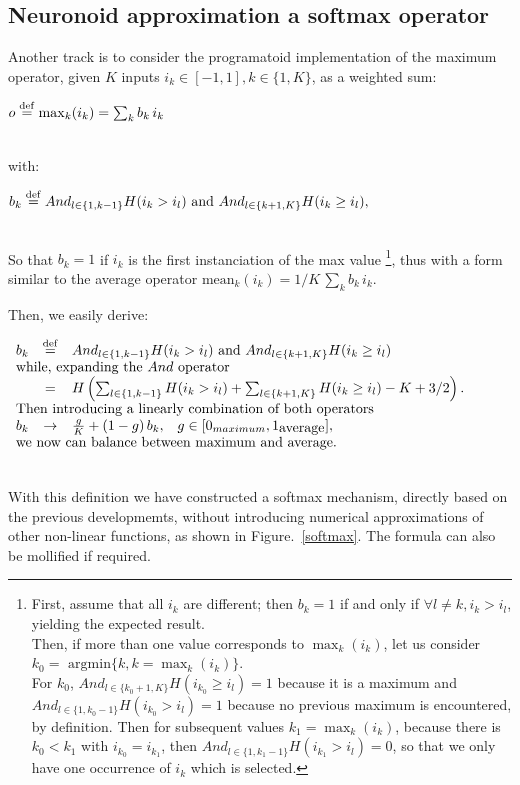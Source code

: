 \documentclass[a4]{article}
\newcommand{\eqline}[1]{~\vspace{0.1cm}\\\centerline{$#1$}\vspace{0.1cm}\\}
\newcommand{\defq}{\stackrel {\rm def}{=}}
\begin{document}
\subsection{Neuronoid approximation a softmax operator}

Another track is to consider the programatoid implementation of the maximum operator, given $K$ inputs $i_k \in [-1, 1], k \in \{1, K\}$, as a weighted sum:
\eqline{o \defq \max_k(i_k) = \sum_k b_k \, i_k}
with:
\eqline{b_k \defq And_{l \in \{1, k-1\}} H(i_k >  i_l) \mbox{ and } And_{l \in \{k+1, K\}} H(i_k \ge i_l),}
So that $b_k = 1$ if $i_k$ is the first instanciation of the max value \footnote{
First, assume that all $i_k$ are different; then $b_k = 1$ if and only if $\forall l \ne k, i_k > i_l$, yielding the expected result.\\
Then, if more than one value corresponds to $\max_k(i_k)$, let us consider $k_0 = \mbox{ argmin} \{k, k = \max_k(i_k)\}$. \\
For $k_0$, $And_{l \in \{k_0+1, K\}} H(i_{k_0} \ge i_l) = 1$ because it is a maximum and $And_{l \in \{1, k_0-1\}} H(i_{k_0} >  i_l) =1$ because no previous maximum is encountered, by definition. Then for subsequent values $k_1 = \max_k(i_k)$, because there is $k_0 < k_1$ with $i_{k_0} = i_{k_1}$, then $And_{l \in \{1, k_1-1\}} H(i_{k_1} >  i_l) = 0$, so that we only have one occurrence of $i_k$ which is selected.}, thus with a form similar to the average operator $\mbox{mean}_k(i_k) = 1/K \, \sum_k b_k \, i_k$.

Then, we easily derive:
\eqline{\begin{array}{rcl}
    b_k &\defq& And_{l \in \{1, k-1\}} H(i_k >  i_l) \mbox{ and } And_{l \in \{k+1, K\}} H(i_k \ge i_l) \\
    \multicolumn{3}{l}{\mbox{while, expanding the $And$ operator}}\\
    &=&  H\left(\sum_{l \in \{1, k-1\}}  H(i_k >  i_l) + \sum_{l \in \{k+1, K\}} H(i_k \ge i_l) - K + 3/2\right). \\
    \multicolumn{3}{l}{\mbox{Then introducing a linearly combination of both operators}}\\
    b_k &\rightarrow& \frac{g}{K} + (1 - g) \, b_k, \;\;\; g \in [0_{maximum}, 1_{\mbox{average}}],\\
    \multicolumn{3}{l}{\mbox{we now can balance between maximum and average.}}
\end{array}}

With this definition we have constructed  a softmax mechanism, directly based on the previous developmemts, without introducing numerical approximations of other non-linear functions, as shown in Figure.~\ref{softmax}. The formula can also be mollified if required.
\end{document}

